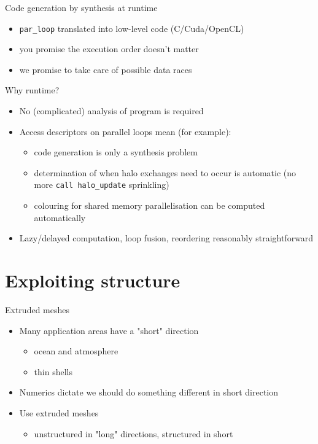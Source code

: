 \documentclass[bigger]{beamer}
\begin{document}
\begin{frame}[fragile,label={sec:orgheadline12}]{Code generation by synthesis at runtime}
 \begin{itemize}
\item \texttt{par\_loop} translated into low-level code (C/Cuda/OpenCL)
\item you promise the execution order doesn't matter
\item we promise to take care of possible data races
\end{itemize}
\end{frame}

\begin{frame}[fragile,label={sec:orgheadline13}]{Why runtime?}
 \begin{itemize}
\item No (complicated) analysis of program is required

\item Access descriptors on parallel loops mean (for example):
\begin{itemize}
\item code generation is only a synthesis problem
\item determination of when halo exchanges need to occur is automatic
(no more \texttt{call halo\_update} sprinkling)
\item colouring for shared memory parallelisation can be computed
automatically
\end{itemize}

\item Lazy/delayed computation, loop fusion, reordering reasonably
straightforward
\end{itemize}
\end{frame}

\section{Exploiting structure}
\label{sec:orgheadline18}

\begin{frame}[label={sec:orgheadline15}]{Extruded meshes}
\begin{itemize}
\item Many application areas have a "short" direction
\begin{itemize}
\item ocean and atmosphere
\item thin shells
\end{itemize}
\item Numerics dictate we should do something different in short
direction
\item Use extruded meshes
\begin{itemize}
\item unstructured in "long" directions, structured in short
\end{itemize}
\end{itemize}
\end{frame}
\end{document}
